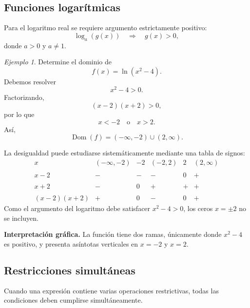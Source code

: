 \documentclass[12pt]{article}
\theoremstyle{remark}
\newtheorem{ejemplo}{Ejemplo}[section]
\newcommand{\Dom}{\operatorname{Dom}}
\begin{document}
\subsection*{Funciones logarítmicas}

Para el logaritmo real se requiere argumento estrictamente positivo:
\[
\log_a(g(x))
\quad\Longrightarrow\quad
g(x)>0,
\]
donde $a>0$ y $a\neq1$.

\begin{ejemplo}
Determine el dominio de
\[
f(x)=\ln(x^2-4).
\]
Debemos resolver
\[
x^2-4>0.
\]
Factorizando,
\[
(x-2)(x+2)>0,
\]
por lo que
\[
x<-2\quad\text{o}\quad x>2.
\]
Así,
\[
\Dom(f)=(-\infty,-2)\cup(2,\infty).
\]

La desigualdad puede estudiarse sistemáticamente mediante una tabla de signos:
\[
\begin{array}{c|ccccc}
x&(-\infty,-2)&-2&(-2,2)&2&(2,\infty)\\\\ \hline
x-2&-&-&-&0&+\\\\
x+2&-&0&+&+&+\\\\ \hline
(x-2)(x+2)&+&0&-&0&+
\end{array}
\]
Como el argumento del logaritmo debe satisfacer $x^2-4>0$, los ceros
$x=\pm2$ no se incluyen.

\textbf{Interpretación gráfica.} La función tiene dos ramas, únicamente donde
$x^2-4$ es positivo, y presenta asíntotas verticales en $x=-2$ y $x=2$.
\begin{center}
\end{center}
\end{ejemplo}

\subsection*{Restricciones simultáneas}

Cuando una expresión contiene varias operaciones restrictivas, todas las
condiciones deben cumplirse simultáneamente.
\end{document}
